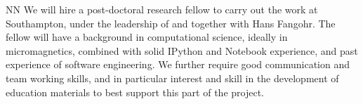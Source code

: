\begin{participant}[type=R, PM=32]{NN}
  We will hire a post-doctoral research fellow to carry out the work
  at Southampton, under the leadership of and together with Hans
  Fangohr. The fellow will have a background in computational science,
  ideally in micromagnetics, combined with solid IPython and
  \Jupyter{} Notebook experience, and past experience of software
  engineering. We further require good communication and team working
  skills, and in particular interest and skill in the development of
  education materials to best support this part of the project.
\end{participant}